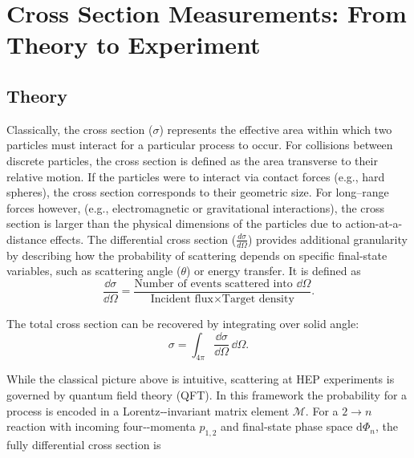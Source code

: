 \section{Cross Section Measurements: From Theory to Experiment}
\subsection{Theory}
    Classically, the cross section (\(\sigma\)) represents the effective area within which two particles must interact for a particular process to occur.
%
For collisions between discrete particles, the cross section is defined as the area transverse to their relative motion.
%
If the particles were to interact via contact forces (e.g., hard spheres), the cross section corresponds to their geometric size.
%
For long--range forces however, (e.g., electromagnetic or gravitational interactions), the cross section is larger than the physical dimensions of the particles due to action-at-a-distance effects.
%
The differential cross section (\(\frac{d\sigma}{d\Omega}\)) provides additional granularity by describing how the probability of scattering depends on specific final-state variables, such as scattering angle (\(\theta\)) or energy transfer. It is defined as
\begin{equation}
    \frac{\dd\sigma}{\dd\Omega} = \frac{\text{Number of events scattered into } \dd\Omega}{\text{Incident flux} \times \text{Target density}}.
\end{equation}

The total cross section can be recovered by integrating over solid angle:
\begin{equation}
\sigma = \int_{4\pi} \frac{\dd\sigma}{\dd\Omega} \, \dd\Omega.
\end{equation}

    While the classical picture above is intuitive, scattering at HEP experiments is governed by quantum field theory (QFT).
    In this framework the probability for a process is encoded in a Lorentz‑-invariant matrix element \(\mathcal{M}\).
    For a \(2 \to n\) reaction with incoming four‑-momenta \(p_{1,2}\) and final‑state phase space \( \text{d}\Phi_n \), the fully differential cross section is

